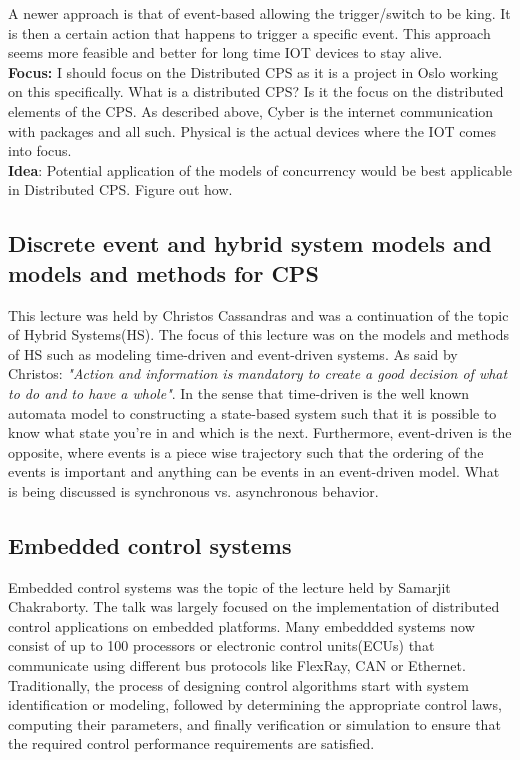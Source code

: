 \documentclass[9pt, english, a4paper]{article}
\theoremstyle{definition}
\begin{document}
	A newer approach is that of event-based allowing the trigger/switch to be king. It is then a certain action that happens to trigger a specific event. This approach seems more feasible and better for long time IOT devices to stay alive.\\

	\noindent \textbf{Focus:} I should focus on the Distributed CPS as it is a project in Oslo working on this specifically. What is a distributed CPS? Is it the focus on the distributed elements of the CPS. As described above, Cyber is the internet communication with packages and all such. Physical is the actual devices where the IOT comes into focus.\\

	\noindent \textbf{Idea}: Potential application of the models of concurrency would be best applicable in Distributed CPS. Figure out how.

\subsection{Discrete event and hybrid system models and models and methods for CPS}
	
	This lecture was held by Christos Cassandras and was a continuation of the topic of Hybrid Systems(HS). The focus of this lecture was on the models and methods of HS such as modeling time-driven and event-driven systems. As said by Christos: \emph{"Action and information is mandatory to create a good decision of what to do and to have a whole"}. In the sense that time-driven is the well known automata model to constructing a state-based system such that it is possible to know what state you're in and which is the next. Furthermore, event-driven is the opposite, where events is a piece wise trajectory such that the ordering of the events is important and anything can be events in an event-driven model. What is being discussed is synchronous vs. asynchronous behavior.
	

\subsection{Embedded control systems}
	Embedded control systems was the topic of the lecture held by Samarjit Chakraborty. The talk was largely focused on the implementation of distributed control applications on embedded platforms. Many embeddded systems now consist of up to 100 processors or electronic control units(ECUs) that communicate using different bus protocols like FlexRay, CAN or Ethernet. Traditionally, the process of designing control algorithms start with system identification or modeling, followed by determining the appropriate control laws, computing their parameters, and finally verification or simulation to ensure that the required control performance requirements are satisfied.
\end{document}
